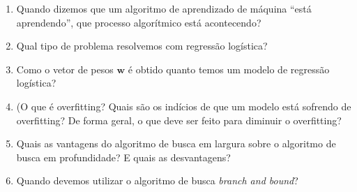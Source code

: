 \documentclass{article}
\begin{document}
\begin{enumerate}
\item Quando dizemos que um algoritmo de aprendizado de máquina ``está aprendendo'', que processo algorítmico está acontecendo?

\item Qual tipo de problema resolvemos com regressão logística?

\item Como o vetor de pesos $\mathbf{w}$ é obtido quanto temos um modelo de regressão logística? 

\item (O que é overfitting? Quais são os indícios de que um modelo está sofrendo de overfitting? De forma geral, o que deve ser feito para diminuir o overfitting?

\item Quais as vantagens do algoritmo de busca em largura sobre o algoritmo de busca em profundidade? E quais as desvantagens?

\item Quando devemos utilizar o algoritmo de busca \textit{branch and bound}?

\end{enumerate}
\end{document}
